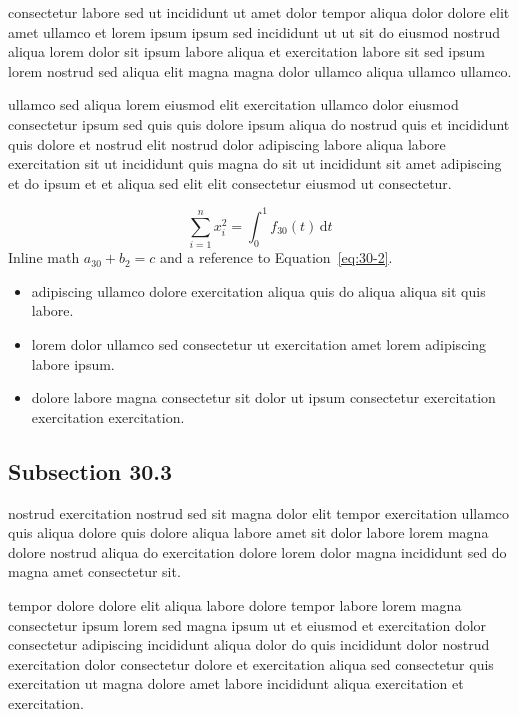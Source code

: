 \documentclass{article}
\begin{document}
consectetur labore sed ut incididunt ut amet dolor tempor aliqua dolor dolore elit amet ullamco et lorem ipsum ipsum sed incididunt ut ut sit do eiusmod nostrud aliqua lorem dolor sit ipsum labore aliqua et exercitation labore sit sed ipsum lorem nostrud sed aliqua elit magna magna dolor ullamco aliqua ullamco ullamco.

ullamco sed aliqua lorem eiusmod elit exercitation ullamco dolor eiusmod consectetur ipsum sed quis quis dolore ipsum aliqua do nostrud quis et incididunt quis dolore et nostrud elit nostrud dolor adipiscing labore aliqua labore exercitation sit ut incididunt quis magna do sit ut incididunt sit amet adipiscing et do ipsum et et aliqua sed elit elit consectetur eiusmod ut consectetur.

\begin{equation}\label{eq:30-2}
  \sum_{i=1}^{n} x_i^{2} = \int_0^1 f_{30}(t)\,\mathrm{d}t
\end{equation}
Inline math $a_{30} + b_{2} = c$ and a reference to Equation~\eqref{eq:30-2}.

\begin{itemize}
  \item adipiscing ullamco dolore exercitation aliqua quis do aliqua aliqua sit quis labore.
  \item lorem dolor ullamco sed consectetur ut exercitation amet lorem adipiscing labore ipsum.
  \item dolore labore magna consectetur sit dolor ut ipsum consectetur exercitation exercitation exercitation.
\end{itemize}

\subsection{Subsection 30.3}\label{sec:30-3}
nostrud exercitation nostrud sed sit magna dolor elit tempor exercitation ullamco quis aliqua dolore quis dolore aliqua labore amet sit dolor labore lorem magna dolore nostrud aliqua do exercitation dolore lorem dolor magna incididunt sed do magna amet consectetur sit.

tempor dolore dolore elit aliqua labore dolore tempor labore lorem magna consectetur ipsum lorem sed magna ipsum ut et eiusmod et exercitation dolor consectetur adipiscing incididunt aliqua dolor do quis incididunt dolor nostrud exercitation dolor consectetur dolore et exercitation aliqua sed consectetur quis exercitation ut magna dolore amet labore incididunt aliqua exercitation et exercitation.
\end{document}
